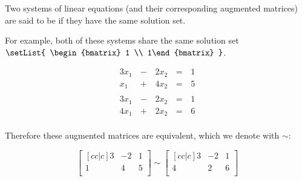 \begin{definition}
  Two systems of linear equations (and their corresponding augmented
  matrices) are said to be  if they have the same
  solution set.

  For example, both of these systems share the same solution set
  \(\setList{ \begin{bmatrix} 1 \\ 1\end{bmatrix} }\).

  \begin{multicols}{2}\noindent
    \begin{alignat*}{3}
      3x_1 &\,-\,& 2x_2 &\,=\,& 1 \\
      x_1 &\,+\,& 4x_2 &\,=\,& 5 \\
    \end{alignat*}
    \begin{alignat*}{3}
      3x_1 &\,-\,& 2x_2 &\,=\,& 1 \\
      4x_1 &\,+\,& 2x_2 &\,=\,& 6 \\
    \end{alignat*}
  \end{multicols}

  Therefore these augmented matrices are equivalent,
  which we denote with \(\sim\):

    \[
      \begin{bmatrix}[cc|c]
        3 & -2 & 1\\
        1 &  4 & 5\\
      \end{bmatrix}
    \sim
      \begin{bmatrix}[cc|c]
        3 & -2 & 1\\
        4 &  2 & 6\\
      \end{bmatrix}
    \]
\end{definition}

